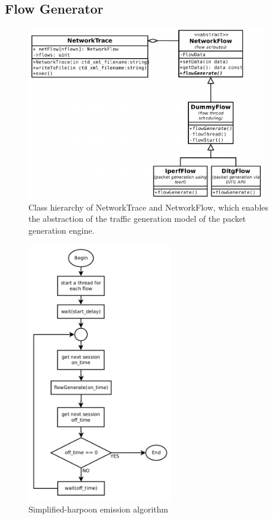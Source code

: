 

\subsection{Flow Generator}

\begin{figure}[ht!]
	\centering
	\includegraphics[height=3.0in]{figures/ch3/trace-flow}
	\caption{Class hierarchy of NetworkTrace and NetworkFlow, which enables the abstraction of the traffic generation model of the packet generation engine.}
	\label{fig:network-trace-flow-class-diagram}
\end{figure}

\begin{figure}[ht!]
    \centering
    \includegraphics[height=4.5in]{figures/ch3/alg-simplified-harpoon}
    \caption{Simplified-harpoon emission algorithm}
    \label{fig:alg-simplified-harpoon}
\end{figure}


